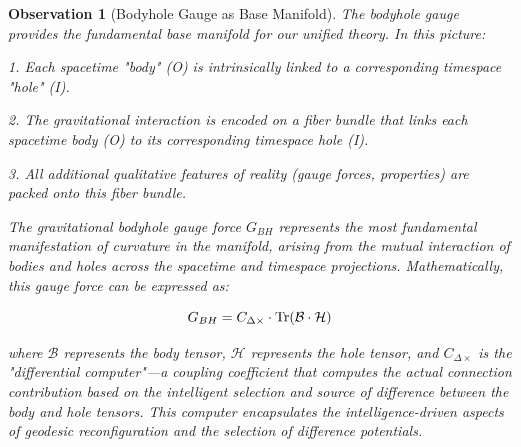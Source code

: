 \documentclass{article}
\newtheorem{observation}{Observation}
\begin{document}
\begin{observation}[Bodyhole Gauge as Base Manifold]
The bodyhole gauge provides the fundamental base manifold for our unified theory. In this picture:

1. Each spacetime "body" (O) is intrinsically linked to a corresponding timespace "hole" (I).

2. The gravitational interaction is encoded on a fiber bundle that links each spacetime body (O) to its corresponding timespace hole (I).

3. All additional qualitative features of reality (gauge forces, properties) are packed onto this fiber bundle.

The gravitational bodyhole gauge force $G_{BH}$ represents the most fundamental manifestation of curvature in the manifold, arising from the mutual interaction of bodies and holes across the spacetime and timespace projections. Mathematically, this gauge force can be expressed as:

\begin{equation}
G_{BH} = C_{\Delta\times} \cdot \Tr(\mathcal{B} \cdot \mathcal{H})
\end{equation}

where $\mathcal{B}$ represents the body tensor, $\mathcal{H}$ represents the hole tensor, and $C_{\Delta\times}$ is the "differential computer"—a coupling coefficient that computes the actual connection contribution based on the intelligent selection and source of difference between the body and hole tensors. This computer encapsulates the intelligence-driven aspects of geodesic reconfiguration and the selection of difference potentials.
\end{observation}
\end{document}
